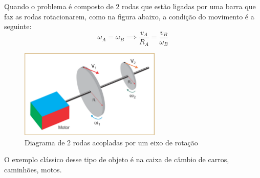 \documentclass[12pt]{extarticle}
\newcommand{\<}{\langle}
\renewcommand{\>}{\rangle}
\theoremstyle{definition}
\begin{document}
Quando o problema é composto de 2 rodas que estão ligadas por uma barra que faz as rodas rotacionarem, como na figura abaixo, a condição do movimento é a seguinte:
\begin{equation}
    \omega_A = \omega_B \implies \frac{v_A}{R_A} = \frac{v_B}{\omega_B}
\end{equation}

\begin{figure}[H]
    \centering
    \includegraphics[width=0.6\textwidth]{motorvolta.png}
    \caption{Diagrama de 2 rodas acopladas por um eixo de rotação}
    \label{fig:eixo}
\end{figure}

O exemplo clássico desse tipo de objeto é na caixa de câmbio de carros, caminhões, motos.
\end{document}
